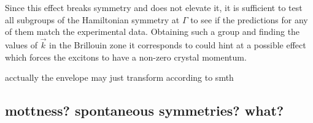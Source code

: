 Since this effect breaks symmetry and does not elevate it, it is sufficient to test all subgroups of the Hamiltonian symmetry at $\Gamma$ to see if the predictions for any of them match the experimental data. Obtaining such a group and finding the values of $\vec{k}$ in the Brillouin zone it corresponds to could hint at a possible effect which forces the excitons to have a non-zero crystal momentum.

acctually the envelope may just transform according to smth

\subsection{mottness? spontaneous symmetries? what?}
